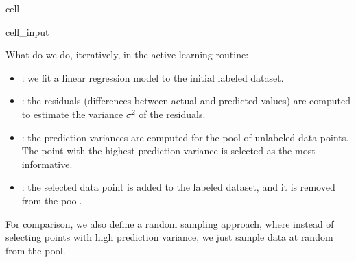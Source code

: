 \documentclass[letterpaper,10pt,english]{jupyterBook}
\begin{document}
\begin{sphinxuseclass}{cell}
\begin{sphinxVerbatimInput}
\begin{sphinxuseclass}{cell_input}
\begin{sphinxVerbatim}[commandchars=\\\{\}]
        
        
    
         
\end{sphinxVerbatim}

\end{sphinxuseclass}\end{sphinxVerbatimInput}

\end{sphinxuseclass}
\sphinxAtStartPar
What do we do, iteratively, in the active learning routine:
\begin{itemize}
\item {} 
\sphinxAtStartPar
{}: we fit a linear regression model to the initial labeled dataset.

\item {} 
\sphinxAtStartPar
{}: the residuals (differences between actual and predicted values) are computed to estimate the variance \(\sigma^2\) of the residuals.

\item {} 
\sphinxAtStartPar
{}: the prediction variances are computed for the pool of unlabeled data points. The point with the highest prediction variance is selected as the most informative.

\item {} 
\sphinxAtStartPar
{}: the selected data point is added to the labeled dataset, and it is removed from the pool.

\end{itemize}

\sphinxAtStartPar
For comparison, we also define a random sampling approach, where instead of selecting points with high prediction variance, we just sample data at random from the pool.
\end{document}
